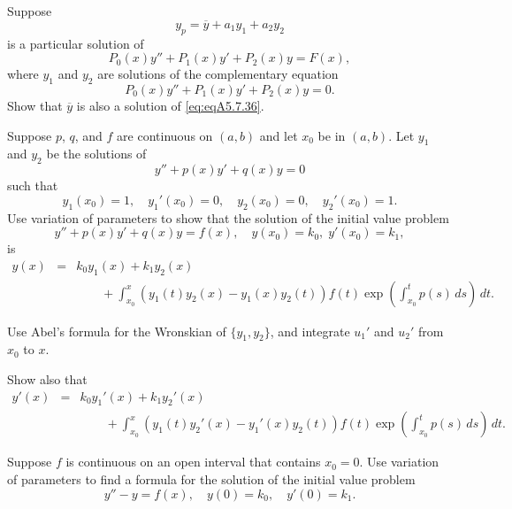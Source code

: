 \documentclass{ximera}
\begin{document}
\begin{problem}\label{exer:5.7.36}
Suppose
$$
y_p=\overline y+a_1y_1+a_2y_2
$$
is a particular solution of \begin{equation}\label{eq:eqA5.7.36}
P_0(x)y''+P_1(x)y'+P_2(x)y=F(x),
\end{equation}
where  $y_1$  and $y_2$ are  solutions of the complementary equation
$$
P_0(x)y''+P_1(x)y'+P_2(x)y=0.
$$
Show that $\overline y$  is also a solution of \ref{eq:eqA5.7.36}.
\end{problem}

\begin{problem}\label{exer:5.7.37}
Suppose $p$,  $q$, and $f$ are continuous
on $(a,b)$ and let $x_0$ be in $(a,b)$. Let
$y_1$ and $y_2$ be the  solutions of
$$
y''+p(x)y'+q(x)y=0
$$
such that
$$
y_1(x_0)=1, \quad y_1'(x_0)=0, \quad y_2(x_0)=0, \quad
y_2'(x_0)=1.
$$
Use variation of parameters to show that the solution of the initial
value problem
$$
y''+p(x)y'+q(x)y=f(x), \quad   y(x_0)=k_0,\;  y'(x_0)=k_1,
$$
is
$$
\begin{array}{rcl}
y(x) &=& k_0y_1(x)+k_1y_2(x) \\
& & \qquad+\int^x_{x_0}\left(y_1(t)y_2(x)-
y_1(x)y_2(t)\right)
f(t)\exp\left(\int^t_{x_0}p(s)\,ds\right)\,dt.
\end{array}
$$
\begin{hint}
Use Abel's formula for the Wronskian of $\{y_1,y_2\}$, and
integrate $u_1'$ and $u_2'$ from $x_0$ to $x$.
\end{hint}
Show also that
$$
\begin{array}{rcl}
y'(x) &=& k_0y_1'(x)+k_1y_2'(x) \\
& & \qquad+\int^x_{x_0}\left(y_1(t)y_2'(x)-y_1'(x)y_2(t)
\right)f(t)\exp\left(\int^t_{x_0}p(s)\,ds\right)\,dt.
\end{array}
$$
\end{problem}

\begin{problem}\label{exer:5.7.38}
Suppose $f$ is continuous on an open interval
that contains $x_0=0$.
Use variation of parameters to
find a formula for the solution of the initial value problem
$$
y''-y=f(x), \quad  y(0)=k_0,\quad y'(0)=k_1.
$$
\end{problem}
\end{document}

